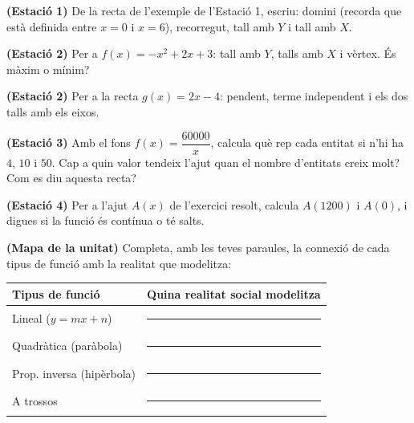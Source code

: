 \begin{exercicis}
\begin{exlist}
  \item \textbf{(Estació 1)} De la recta de l'exemple de l'Estació 1, escriu: domini
        (recorda que està definida entre $x=0$ i $x=6$), recorregut, tall amb $Y$ i
        tall amb $X$.
  \item \textbf{(Estació 2)} Per a $f(x)=-x^2+2x+3$: tall amb $Y$, talls amb $X$ i
        vèrtex. És màxim o mínim?
  \item \textbf{(Estació 2)} Per a la recta $g(x)=2x-4$: pendent, terme independent i
        els dos talls amb els eixos.
  \item \textbf{(Estació 3)} Amb el fons $f(x)=\dfrac{\num{60000}}{x}$, calcula què rep
        cada entitat si n'hi ha $4$, $10$ i $50$. Cap a quin valor tendeix l'ajut quan
        el nombre d'entitats creix molt? Com es diu aquesta recta?
  \item \textbf{(Estació 4)} Per a l'ajut $A(x)$ de l'exercici resolt, calcula
        $A(1200)$ i $A(0)$, i digues si la funció és contínua o té salts.
  \item \textbf{(Mapa de la unitat)} Completa, amb les teves paraules, la connexió de
        cada tipus de funció amb la realitat que modelitza:
        \begin{center}
        \renewcommand{\arraystretch}{1.4}
        \begin{tabular}{p{4.4cm} p{8.2cm}}
        \toprule
        \textbf{Tipus de funció} & \textbf{Quina realitat social modelitza} \\
        \midrule
        Lineal ($y=mx+n$) & \rule{7.6cm}{0.4pt} \\
        Quadràtica (paràbola) & \rule{7.6cm}{0.4pt} \\
        Prop. inversa (hipèrbola) & \rule{7.6cm}{0.4pt} \\
        A trossos & \rule{7.6cm}{0.4pt} \\
        \bottomrule
        \end{tabular}
        \end{center}
\end{exlist}
\end{exercicis}

